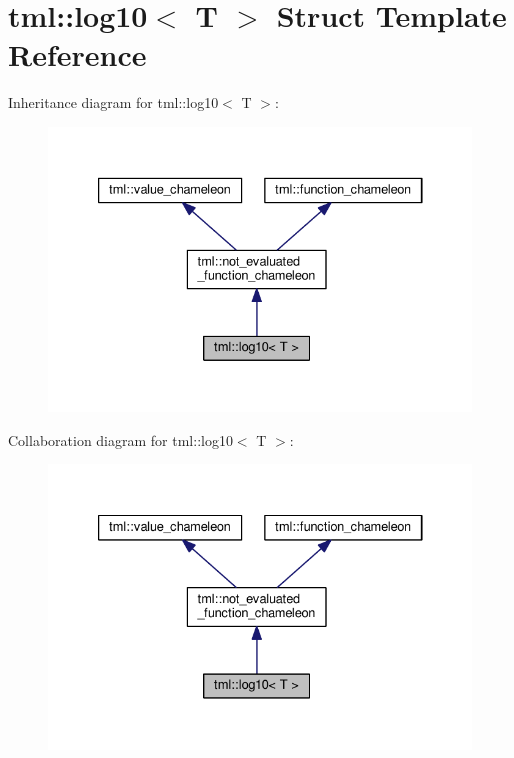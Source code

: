 \hypertarget{structtml_1_1log10}{\section{tml\+:\+:log10$<$ T $>$ Struct Template Reference}
\label{structtml_1_1log10}
}


Inheritance diagram for tml\+:\+:log10$<$ T $>$\+:
\nopagebreak
\begin{figure}[H]
\begin{center}
\leavevmode
\includegraphics[width=333pt]{structtml_1_1log10__inherit__graph}
\end{center}
\end{figure}


Collaboration diagram for tml\+:\+:log10$<$ T $>$\+:
\nopagebreak
\begin{figure}[H]
\begin{center}
\leavevmode
\includegraphics[width=333pt]{structtml_1_1log10__coll__graph}
\end{center}
\end{figure}
